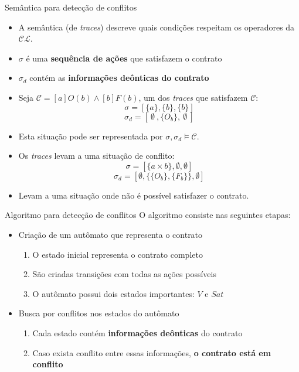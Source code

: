\begin{frame}{Semântica para detecção de conflitos}
\begin{itemize}
\item A semântica (de \textit{traces}) descreve quais condições respeitam os operadores da $\mathcal{CL}$.
\item $\sigma$ é uma \textbf{sequência de ações} que satisfazem o contrato
\item $\sigma_d$ contém as \textbf{informações deônticas do contrato} 
\item Seja $\mathcal{C} = [a]O(b)\wedge[b]F(b)$, um dos \textit{traces} que satisfazem $\mathcal{C}$:
$$\sigma = [\{a\}, \{b\}, \{b\}]$$
$$\sigma_d = [\ \emptyset\ , \{O_b\},\ \emptyset \ ]$$
\item Esta situação pode ser representada por $\sigma,\sigma_d\models\mathcal{C}$.
\item Os \textit{traces} levam a uma situação de conflito:
\[\sigma = [\{a\times b\},\emptyset,\emptyset]\] 
\[\sigma_d = [\emptyset, \{\{O_b\},\{F_b\}\},\emptyset]\]
\item Levam a uma situação onde não é possível satisfazer o contrato.
\end{itemize}
\end{frame}

\begin{frame}{Algoritmo para detecção de conflitos}
O algoritmo consiste nas seguintes etapas:
\begin{itemize}
\item Criação de um autômato que representa o contrato
	\begin{enumerate}
	\item O estado inicial representa o contrato completo
	\item São criadas transições com todas as ações possíveis
	\item O autômato possui dois estados importantes: {\color{red}$V$} e {\color{OliveGreen}$Sat$}
	\end{enumerate}
\item Busca por conflitos nos estados do autômato
	\begin{enumerate}
	\item Cada estado contém \textbf{informações deônticas} do contrato
	\item Caso exista conflito entre essas informações, \textbf{o contrato está em conflito}
	\end{enumerate}
\end{itemize}

\end{frame}

